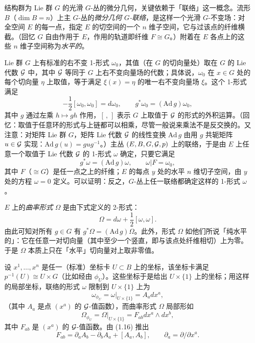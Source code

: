 结构群为 Lie 群 $G$ 的光滑 $G$-丛的微分几何，关键依赖于「联络」这一概念。流形 $B$（$\dim B=n$）上主 $G$-丛的\emph{微分几何 $G$-联络}，是这样一个光滑 $G$-不变场：对全空间 $E$ 的每一点，指定 $E$ 的切空间的一个 $n$ 维子空间，它与过该点的纤维横截。（回忆 $G$ 自由作用于 $E$，作用的轨道即纤维 $F\cong G$。）附着在 $E$ 各点上的这些 $n$ 维子空间称为\emph{水平的}。

Lie 群 $G$ 上有标准的右不变 1-形式 $\omega_0$，其值（在 $G$ 的切向量处）取在 $G$ 的 Lie 代数 $\mathcal{G}$ 中，其中 $\mathcal{G}$ 等同于 $G$ 上右不变向量场的代数；具体说，$\omega_0$ 在 $x\in G$ 处的每个切向量 $\eta$ 上取值，等于满足 $\xi(x)=\eta$ 的唯一右不变向量场 $\xi$。这个 1-形式满足
\begin{equation}
-\frac12[\omega_0,\omega_0]=d\omega_0,\qquad g^*\omega_0=(\mathrm{Ad}\,g)\omega_0, \tag{1.14}
\end{equation}
其中 $g$ 通过左乘 $h\mapsto gh$ 作用，$[\,,\,]$ 表示 $G$ 上取值于 $\mathcal{G}$ 的形式的外积运算。（回忆：取值于任意环的形式与上链都可以相乘，尽管一般说来乘法不是反交换的。又注意：对矩阵 Lie 群 $G$，矩阵 Lie 代数 $\mathcal{G}$ 的线性变换 $\mathrm{Ad}\,g$ 由用 $g$ 共轭矩阵 $u\in\mathcal{G}$ 实现：$\mathrm{Ad}\,g(u)=gug^{-1}$。）主丛 $(E,B,G,\mathcal{G},p)$ 上的联络，于是由 $E$ 上任意一个取值于 Lie 代数 $\mathcal{G}$ 的 1-形式 $\omega$ 确定，只要它满足
\begin{equation}
g^*\omega=(\mathrm{Ad}\,g)\omega,\qquad \omega|F=\omega_0, \tag{1.15}
\end{equation}
其中 $F$（$\cong G$）是任一点之上的纤维；$E$ 的每点 $y$ 处的水平 $n$ 维切子空间，由 $y$ 处的方程 $\omega=0$ 定义。可以证明：反之，$G$-丛上任一联络都确定这样的 1-形式 $\omega$。

$E$ 上的\emph{曲率形式} $\Omega$ 是由下式定义的 2-形式：
\begin{equation}
\Omega=d\omega+\frac12[\omega,\omega]. \tag{1.16}
\end{equation}
由此可知对所有 $g\in G$ 有 $g^*\Omega=(\mathrm{Ad}\,g)\Omega$。此外，形式 $\Omega$ 如他们所说「纯水平的」：它在任意一对切向量（其中至少一个竖直，即与该点处纤维相切）上为零。于是 $\Omega$ 本质上只在「水平」切向量对上取非零值。

设 $x^1,\ldots,x^n$ 是任一（标准）坐标卡 $U\subset B$ 上的坐标，该坐标卡满足 $p^{-1}(U)\cong U\times G$（比如经由 $\phi_U$）。这些坐标于是给出 $U\times\{1\}$ 上的坐标；用这样的局部坐标，联络的形式 $\omega$ 限制到 $U\times\{1\}$ 上为
\[
\omega_{\phi_U}=\omega|_{U\times\{1\}}=A_adx^a,
\]
（其中 $A_a$ 是点 $(x^a)$ 的 $\mathcal{G}$-值函数），而曲率形式 $\Omega$ 局部形如
\[
\Omega_{\phi_U}=\Omega|_{U\times\{1\}}=F_{ab}dx^a\wedge dx^b,
\]
其中 $F_{ab}$ 是 $(x^a)$ 的 $\mathcal{G}$-值函数。由 (1.16) 推出
\begin{equation}
F_{ab}=\partial_aA_b-\partial_bA_a+[A_a,A_b],\qquad \partial_a=\partial/\partial x^a. \tag{1.17}
\end{equation}

